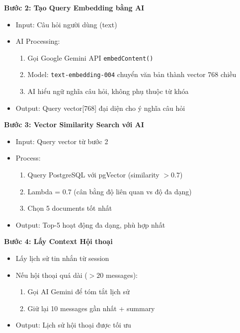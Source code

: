 \textbf{Bước 2: Tạo Query Embedding bằng AI}
\begin{itemize}
    \item Input: Câu hỏi người dùng (text)
    \item AI Processing:
    \begin{enumerate}
        \item Gọi Google Gemini API \texttt{embedContent()}
        \item Model: \texttt{text-embedding-004} chuyển văn bản thành vector 768 chiều
        \item AI hiểu ngữ nghĩa câu hỏi, không phụ thuộc từ khóa
    \end{enumerate}
    \item Output: Query vector[768] đại diện cho ý nghĩa câu hỏi
\end{itemize}

\textbf{Bước 3: Vector Similarity Search với AI}
\begin{itemize}
    \item Input: Query vector từ bước 2
    \item Process:
    \begin{enumerate}
        \item Query PostgreSQL với pgVector (similarity $> 0.7$)
        \item Lambda = 0.7 (cân bằng độ liên quan vs độ đa dạng)
        \item Chọn 5 documents tốt nhất
    \end{enumerate}
    \item Output: Top-5 hoạt động đa dạng, phù hợp nhất
\end{itemize}

\textbf{Bước 4: Lấy Context Hội thoại}
\begin{itemize}
    \item Lấy lịch sử tin nhắn từ session
    \item Nếu hội thoại quá dài ($>20$ messages):
    \begin{enumerate}
        \item Gọi AI Gemini để tóm tắt lịch sử
        \item Giữ lại 10 messages gần nhất + summary
    \end{enumerate}
    \item Output: Lịch sử hội thoại được tối ưu
\end{itemize}

